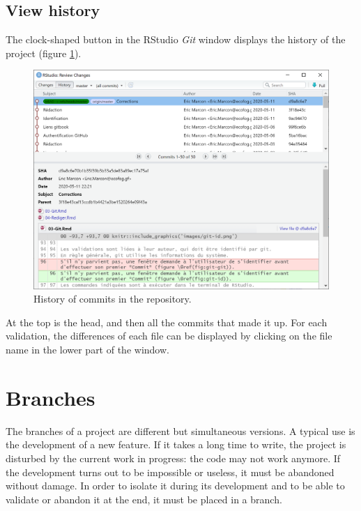 \documentclass[
  12pt,
  american,
  a4paper,
  extrafontsizes,onecolumn,openright
  ]{memoir}
\begin{document}
\subsection{View history}\label{view-history}

The clock-shaped button in the RStudio \emph{Git} window displays the history of the project (figure \ref{fig:git-history}).



\scriptsize

\begin{figure}

{\centering \includegraphics[width=0.8\linewidth]{images/git-historique} 

}

\caption{History of commits in the repository.}\label{fig:git-history}
\end{figure}

\normalsize

At the top is the head, and then all the commits that made it up.
For each validation, the differences of each file can be displayed by clicking on the file name in the lower part of the window.

\section{Branches}\label{sec:branches}

The branches of a project are different but simultaneous versions.
A typical use is the development of a new feature.
If it takes a long time to write, the project is disturbed by the current work in progress: the code may not work anymore.
If the development turns out to be impossible or useless, it must be abandoned without damage.
In order to isolate it during its development and to be able to validate or abandon it at the end, it must be placed in a branch.
\end{document}
